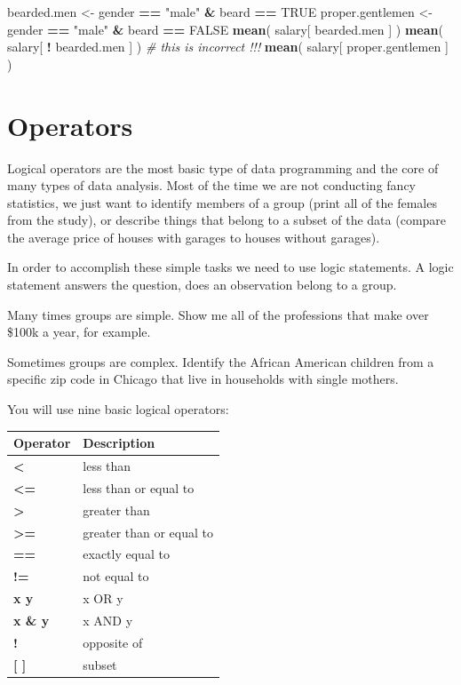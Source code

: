 \documentclass[]{book}
\newenvironment{Shaded}{\begin{snugshade}}{\end{snugshade}}
\newcommand{\CommentTok}[1]{\textcolor[rgb]{0.56,0.35,0.01}{\textit{#1}}}
\newcommand{\KeywordTok}[1]{\textcolor[rgb]{0.13,0.29,0.53}{\textbf{#1}}}
\newcommand{\NormalTok}[1]{#1}
\newcommand{\OperatorTok}[1]{\textcolor[rgb]{0.81,0.36,0.00}{\textbf{#1}}}
\newcommand{\OtherTok}[1]{\textcolor[rgb]{0.56,0.35,0.01}{#1}}
\newcommand{\StringTok}[1]{\textcolor[rgb]{0.31,0.60,0.02}{#1}}
\theoremstyle{definition}
\theoremstyle{definition}
\theoremstyle{definition}
\theoremstyle{remark}
\begin{document}
\begin{Shaded}
\begin{Highlighting}[]
\NormalTok{bearded.men <-}\StringTok{ }\NormalTok{gender }\OperatorTok{==}\StringTok{ "male"} \OperatorTok{&}\StringTok{ }\NormalTok{beard }\OperatorTok{==}\StringTok{ }\OtherTok{TRUE}
\NormalTok{proper.gentlemen <-}\StringTok{ }\NormalTok{gender }\OperatorTok{==}\StringTok{ "male"} \OperatorTok{&}\StringTok{ }\NormalTok{beard }\OperatorTok{==}\StringTok{ }\OtherTok{FALSE}
\KeywordTok{mean}\NormalTok{( salary[ bearded.men ] )}
\KeywordTok{mean}\NormalTok{( salary[ }\OperatorTok{!}\StringTok{ }\NormalTok{bearded.men ] )  }\CommentTok{# this is incorrect !!!}
\KeywordTok{mean}\NormalTok{( salary[ proper.gentlemen ] )}
\end{Highlighting}
\end{Shaded}

\hypertarget{operators}{%
\section{Operators}\label{operators}}

Logical operators are the most basic type of data programming and the
core of many types of data analysis. Most of the time we are not
conducting fancy statistics, we just want to identify members of a group
(print all of the females from the study), or describe things that
belong to a subset of the data (compare the average price of houses with
garages to houses without garages).

In order to accomplish these simple tasks we need to use logic
statements. A logic statement answers the question, does an observation
belong to a group.

Many times groups are simple. Show me all of the professions that make
over \$100k a year, for example.

Sometimes groups are complex. Identify the African American children
from a specific zip code in Chicago that live in households with single
mothers.

You will use nine basic logical operators:

\begin{longtable}[]{@{}ll@{}}
\toprule
Operator & Description\tabularnewline
\midrule
\endhead
\textbf{\textless{}} & less than\tabularnewline
\textbf{\textless{}=} & less than or equal to\tabularnewline
\textbf{\textgreater{}} & greater than\tabularnewline
\textbf{\textgreater{}=} & greater than or equal to\tabularnewline
\textbf{==} & exactly equal to\tabularnewline
\textbf{!=} & not equal to\tabularnewline
\textbf{x \textbar{} y} & x OR y\tabularnewline
\textbf{x \& y} & x AND y\tabularnewline
\textbf{!} & opposite of\tabularnewline
\textbf{{[} {]}} & subset\tabularnewline
\bottomrule
\end{longtable}
\end{document}
